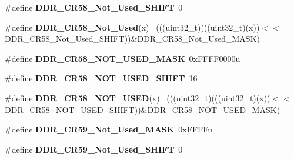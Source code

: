 \begin{DoxyCompactItemize}
\item 
\hypertarget{group___d_d_r___register___masks_ga85188df722655f29764d2764c756df44}{}\#define {\bfseries D\+D\+R\+\_\+\+C\+R58\+\_\+\+Not\+\_\+\+Used\+\_\+\+S\+H\+I\+F\+T}~0\label{group___d_d_r___register___masks_ga85188df722655f29764d2764c756df44}

\item 
\hypertarget{group___d_d_r___register___masks_gac515f89a84aeb7d64fce22f7f02d50f4}{}\#define {\bfseries D\+D\+R\+\_\+\+C\+R58\+\_\+\+Not\+\_\+\+Used}(x)                                      ~(((uint32\+\_\+t)(((uint32\+\_\+t)(x))$<$$<$D\+D\+R\+\_\+\+C\+R58\+\_\+\+Not\+\_\+\+Used\+\_\+\+S\+H\+I\+F\+T))\&D\+D\+R\+\_\+\+C\+R58\+\_\+\+Not\+\_\+\+Used\+\_\+\+M\+A\+S\+K)\label{group___d_d_r___register___masks_gac515f89a84aeb7d64fce22f7f02d50f4}

\item 
\hypertarget{group___d_d_r___register___masks_gaca0cd57a54cca49f87349a0038abfd19}{}\#define {\bfseries D\+D\+R\+\_\+\+C\+R58\+\_\+\+N\+O\+T\+\_\+\+U\+S\+E\+D\+\_\+\+M\+A\+S\+K}~0x\+F\+F\+F\+F0000u\label{group___d_d_r___register___masks_gaca0cd57a54cca49f87349a0038abfd19}

\item 
\hypertarget{group___d_d_r___register___masks_gab0447c558110ec4616974381600805a0}{}\#define {\bfseries D\+D\+R\+\_\+\+C\+R58\+\_\+\+N\+O\+T\+\_\+\+U\+S\+E\+D\+\_\+\+S\+H\+I\+F\+T}~16\label{group___d_d_r___register___masks_gab0447c558110ec4616974381600805a0}

\item 
\hypertarget{group___d_d_r___register___masks_gab041afdc2b1ac528355d1cdfe18f81b8}{}\#define {\bfseries D\+D\+R\+\_\+\+C\+R58\+\_\+\+N\+O\+T\+\_\+\+U\+S\+E\+D}(x)                                      ~(((uint32\+\_\+t)(((uint32\+\_\+t)(x))$<$$<$D\+D\+R\+\_\+\+C\+R58\+\_\+\+N\+O\+T\+\_\+\+U\+S\+E\+D\+\_\+\+S\+H\+I\+F\+T))\&D\+D\+R\+\_\+\+C\+R58\+\_\+\+N\+O\+T\+\_\+\+U\+S\+E\+D\+\_\+\+M\+A\+S\+K)\label{group___d_d_r___register___masks_gab041afdc2b1ac528355d1cdfe18f81b8}

\item 
\hypertarget{group___d_d_r___register___masks_ga978eba5f0d02766351042ce2101ef72b}{}\#define {\bfseries D\+D\+R\+\_\+\+C\+R59\+\_\+\+Not\+\_\+\+Used\+\_\+\+M\+A\+S\+K}~0x\+F\+F\+F\+Fu\label{group___d_d_r___register___masks_ga978eba5f0d02766351042ce2101ef72b}

\item 
\hypertarget{group___d_d_r___register___masks_ga58c2a2290e27bd7e3d96e6b9831052ee}{}\#define {\bfseries D\+D\+R\+\_\+\+C\+R59\+\_\+\+Not\+\_\+\+Used\+\_\+\+S\+H\+I\+F\+T}~0\label{group___d_d_r___register___masks_ga58c2a2290e27bd7e3d96e6b9831052ee}


\end{DoxyCompactItemize}
